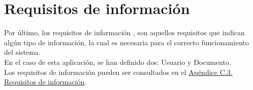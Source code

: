 \section{Requisitos de información}

Por último, los requisitos de información \cite{requisitos}, son aquellos requisitos que indican algún tipo de información, la cual es necesaria para el correcto funcionamiento del sistema.
\\

En el caso de esta aplicación, se han definido dos: Usuario y Documento.
\\

Los requisitos de información pueden ser consultados en el \hyperref[APRequisitosInformacion]{Apéndice C.3. Requisitos de información}.